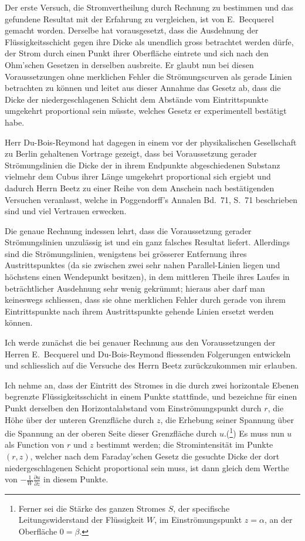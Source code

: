 \documentclass[12pt,a4paper]{article}
\begin{document}
Der erste Versuch, die Stromvertheilung durch Rechnung zu bestimmen und das gefundene Resultat mit der Erfahrung zu vergleichen, ist von E.~Becquerel gemacht worden. Derselbe hat vorausgesetzt, dass die Ausdehnung der Flüssigkeitsschicht gegen ihre Dicke als unendlich gross betrachtet werden dürfe, der Strom durch einen Punkt ihrer Oberfläche eintrete und sich nach den Ohm'schen Gesetzen in derselben ausbreite. Er glaubt nun bei diesen Voraussetzungen ohne merklichen Fehler die Strömungscurven als gerade Linien betrachten zu können und leitet aus dieser Annahme das Gesetz ab, dass die Dicke der niedergeschlagenen Schicht dem Abstände vom Eintrittspunkte umgekehrt proportional sein müsste, welches Gesetz er experimentell bestätigt habe.

Herr Du-Bois-Reymond hat dagegen in einem vor der physikalischen Gesellschaft zu Berlin gehaltenen Vortrage gezeigt, dass bei Voraussetzung gerader Strömungslinien die Dicke der in ihrem Endpunkte abgeschiedenen Substanz vielmehr dem Cubus ihrer Länge umgekehrt proportional sich ergiebt und dadurch Herrn Beetz zu einer Reihe von dem Anschein nach bestätigenden Versuchen veranlasst, welche in Poggendorff's Annalen Bd.~71, S.~71 beschrieben sind und viel Vertrauen erwecken.

Die genaue Rechnung indessen lehrt, dass die Voraussetzung gerader Strömungslinien unzulässig ist und ein ganz falsches Resultat liefert. Allerdings sind die Strömungslinien, wenigstens bei grösserer Entfernung ihres Austrittspunktes (da sie zwischen zwei sehr nahen Parallel-Linien liegen und höchstens einen Wendepunkt besitzen), in dem mittleren Theile ihres Laufes in beträchtlicher Ausdehnung sehr wenig gekrümmt; hieraus aber darf man keineswegs schliessen, dass sie ohne merklichen Fehler durch gerade von ihrem Eintrittspunkte nach ihrem Austrittspunkte gehende Linien ersetzt werden können.

Ich werde zunächst die bei genauer Rechnung aus den Voraussetzungen der Herren E.~Becquerel und Du-Bois-Reymond fliessenden Folgerungen entwickeln und schliesslich auf die Versuche des Herrn Beetz zurückzukommen mir erlauben.

Ich nehme an, dass der Eintritt des Stromes in die durch zwei horizontale Ebenen begrenzte Flüssigkeitsschicht in einem Punkte stattfinde, und bezeichne für einen Punkt derselben den Horizontalabstand vom Einströmungspunkt durch $r$, die Höhe über der unteren Grenzfläche durch $z$, die Erhebung seiner Spannung über die Spannung an der oberen Seite dieser Grenzfläche durch $u$.(\footnote{Ferner sei die Stärke des ganzen Stromes $S$, der specifische Leitungswiderstand der Flüssigkeit $W$, im Einströmungspunkt $z = \alpha$, an der Oberfläche $0 = \beta$.}) Es muss nun $u$ als Function von $r$ und $z$ bestimmt werden; die Stromintensität im Punkte $(r, z)$, welcher nach dem Faraday'schen Gesetz die gesuchte Dicke der dort niedergeschlagenen Schicht proportional sein muss, ist dann gleich dem Werthe von $-\frac{1}{W}\frac{\partial u}{\partial z}$ in diesem Punkte.
\end{document}
